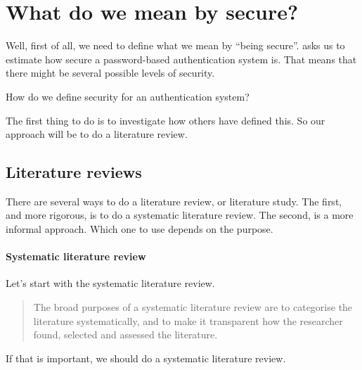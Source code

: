 \section[Define secure?]{What do we mean by secure?}

Well, first of all, we need to define what we mean by \enquote{being secure}.
 asks us to estimate how secure a password-based authentication system 
is.
That means that there might be several possible levels of security.

\begin{frame}[fragile]
  \begin{exercise}
    How do we define security for an authentication system?
  \end{exercise}
\end{frame}

\begin{frame}
  \begin{solution}
    The first thing to do is to investigate how others have defined this.
    So our approach will be to do a literature review.
  \end{solution}
\end{frame}

\subsection{Literature reviews}

There are several ways to do a literature review, or literature study.
The first, and more rigorous, is to do a systematic literature review.
The second, is a more informal approach.
Which one to use depends on the purpose.

\paragraph{Systematic literature review}

Let's start with the systematic literature review.
\blockcquote{ANUSLR}{%
The broad purposes of a systematic literature review are to categorise the 
literature systematically, and to make it transparent how the researcher found, 
selected and assessed the literature.%
}
If that is important, we should do a systematic literature review.

